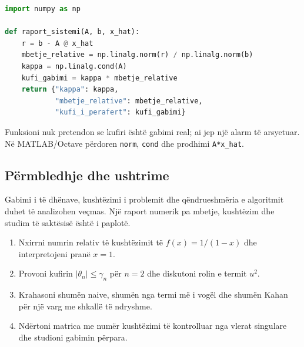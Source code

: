 \begin{lstlisting}[language=Python,caption={Raport diagnostik për një sistem linear.}]
import numpy as np

def raport_sistemi(A, b, x_hat):
    r = b - A @ x_hat
    mbetje_relative = np.linalg.norm(r) / np.linalg.norm(b)
    kappa = np.linalg.cond(A)
    kufi_gabimi = kappa * mbetje_relative
    return {"kappa": kappa,
            "mbetje_relative": mbetje_relative,
            "kufi_i_perafert": kufi_gabimi}
\end{lstlisting}
Funksioni nuk pretendon se kufiri është gabimi real; ai jep një alarm të arsyetuar. Në MATLAB/Octave përdoren \texttt{norm}, \texttt{cond} dhe prodhimi \texttt{A*x\_hat}.

\subsection{Përmbledhje dhe ushtrime}
Gabimi i të dhënave, kushtëzimi i problemit dhe qëndrueshmëria e algoritmit duhet të analizohen veçmas. Një raport numerik pa mbetje, kushtëzim dhe studim të saktësisë është i paplotë.
\begin{enumerate}
\item Nxirrni numrin relativ të kushtëzimit të $f(x)=1/(1-x)$ dhe interpretojeni pranë $x=1$.
\item Provoni kufirin $|\theta_n|\le\gamma_n$ për $n=2$ dhe diskutoni rolin e termit $u^2$.
\item Krahasoni shumën naive, shumën nga termi më i vogël dhe shumën Kahan për një varg me shkallë të ndryshme.
\item Ndërtoni matrica me numër kushtëzimi të kontrolluar nga vlerat singulare dhe studioni gabimin përpara.
\end{enumerate}

